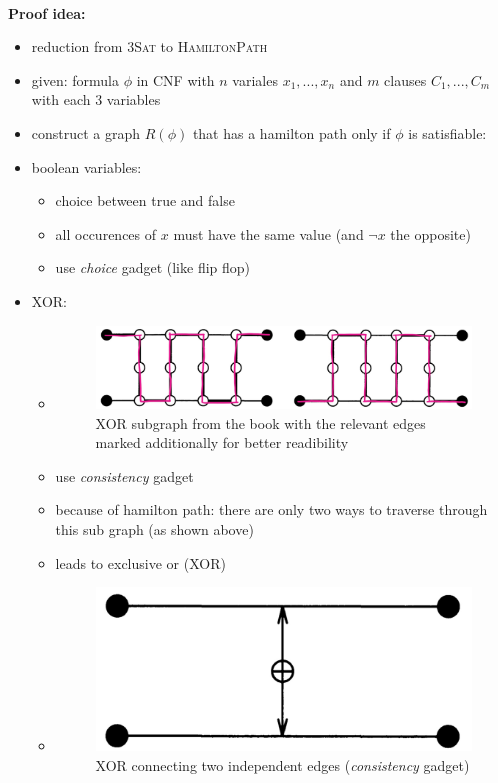 \documentclass[a4]{scrartcl}
\begin{document}
\ \\
\textbf{Proof idea:}
\begin{itemize}
\item reduction from \textsc{3Sat} to \textsc{HamiltonPath}
\item given: formula $\phi$ in CNF with $n$ variales $x_1,...,x_n$ and $m$ clauses $C_1,...,C_m$ with each 3 variables
\item construct a graph $R(\phi)$ that has a hamilton path only if $\phi$ is satisfiable:

\item boolean variables:

\begin{itemize}
\item choice between true and false
\item all occurences of $x$ must have the same value (and $\neg x$ the opposite)
\item use \textit{choice} gadget (like flip flop)
\end{itemize}

\item XOR:

\begin{itemize}
\item[]
\begin{figure}[H]
\begin{center}
\includegraphics[scale=0.5]{xor.jpg}
\end{center}
\caption{XOR subgraph from the book \cite{book} with the relevant edges marked additionally for better readibility}
\end{figure}
\item use \textit{consistency} gadget
\item because of hamilton path: there are only two ways to traverse through this sub graph (as shown above)
\item leads to exclusive or (XOR)
\item[]
\begin{figure}[H]
\begin{center}
\includegraphics[scale=0.2]{xor2.jpg}
\end{center}
\caption{XOR connecting two independent edges (\textit{consistency} gadget) \cite{book}}
\end{figure}
\end{itemize}


\end{itemize}
\end{document}
